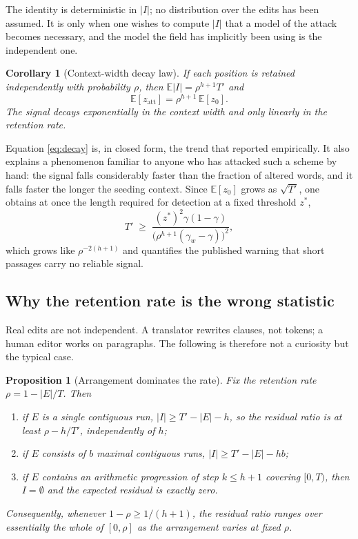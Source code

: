 \documentclass[11pt,a4paper]{article}
\theoremstyle{plain}
\newtheorem{proposition}[theorem]{Proposition}
\newtheorem{corollary}[theorem]{Corollary}
\theoremstyle{definition}
\numberwithin{equation}{section}
\begin{document}
The identity is deterministic in $|I|$; no distribution over the edits
has been assumed. It is only when one wishes to compute $|I|$ that a
model of the attack becomes necessary, and the model the field has
implicitly been using is the independent one.

\begin{corollary}[Context-width decay law]\label{cor:decay}
If each position is retained independently with probability $\rho$, then
$\mathbb{E}|I| = \rho^{h+1}T'$ and
\begin{equation}\label{eq:decay}
\mathbb{E}[z_{\mathrm{att}}] = \rho^{h+1}\,\mathbb{E}[z_0].
\end{equation}
The signal decays exponentially in the context width and only linearly
in the retention rate.
\end{corollary}

Equation \eqref{eq:decay} is, in closed form, the trend that
\cite{KGW24} reported empirically. It also explains a phenomenon
familiar to anyone who has attacked such a scheme by hand: the signal
falls considerably faster than the fraction of altered words, and it
falls faster the longer the seeding context. Since
$\mathbb{E}[z_0]$ grows as $\sqrt{T'}$, one obtains at once the length
required for detection at a fixed threshold $z^{*}$,
\begin{equation}\label{eq:length}
T' \;\ge\; \frac{(z^{*})^{2}\gamma(1-\gamma)}
{\bigl(\rho^{h+1}(\gamma_w-\gamma)\bigr)^{2}},
\end{equation}
which grows like $\rho^{-2(h+1)}$ and quantifies the published warning
that short passages carry no reliable signal.

\subsection{Why the retention rate is the wrong statistic}

Real edits are not independent. A translator rewrites clauses, not
tokens; a human editor works on paragraphs. The following is therefore
not a curiosity but the typical case.

\begin{proposition}[Arrangement dominates the rate]\label{prop:arrangement}
Fix the retention rate $\rho = 1 - |E|/T$. Then
\begin{enumerate}
\item[(i)] if $E$ is a single contiguous run,
$|I| \ge T' - |E| - h$, so the residual ratio is at least
$\rho - h/T'$, \emph{independently of $h$};
\item[(ii)] if $E$ consists of $b$ maximal contiguous runs,
$|I| \ge T' - |E| - hb$;
\item[(iii)] if $E$ contains an arithmetic progression of step
$k \le h+1$ covering $[0,T)$, then $I = \emptyset$ and the expected
residual is exactly zero.
\end{enumerate}
Consequently, whenever $1-\rho \ge 1/(h+1)$, the residual ratio ranges
over essentially the whole of $[0,\rho]$ as the arrangement varies at
fixed $\rho$.
\end{proposition}
\end{document}
